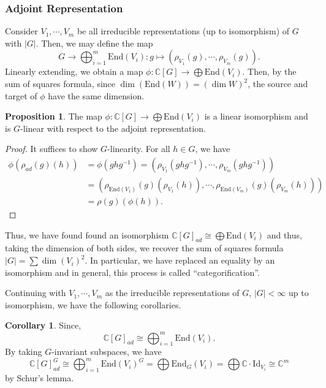\documentclass[]{article}
\theoremstyle{definition}
\newtheorem{corollary}{Corollary}[theorem]
\theoremstyle{definition}
\newtheorem{proposition}{Proposition}[section]
\begin{document}
\subsubsection{Adjoint Representation}

Consider \(V_1, \cdots, V_m\) be all irreducible representations 
(up to isomorphism) of \(G\) with \(|G|\). Then, we may define the map 
\[G \to \bigoplus_{i = 1}^m\text{End}(V_i) : g \mapsto 
  (\rho_{V_1}(g), \cdots, \rho_{V_m}(g)).\]
Linearly extending, we obtain a map \(\phi : \mathbb{C}[G] \to \bigoplus 
\text{End}(V_i)\). Then, by the sum of squares formula, since 
\(\dim(\text{End}(W)) = (\dim W)^2\), the source and target of \(\phi\) have 
the same dimension.

\begin{proposition}
  The map \(\phi : \mathbb{C}[G] \to \bigoplus \text{End}(V_i)\) is a 
  linear isomorphism and is \(G\)-linear with respect to the adjoint 
  representation.
\end{proposition}
\begin{proof}
  It suffices to show \(G\)-linearity. For all \(h \in G\), we have 
  \[\begin{split}
    \phi(\rho_{ad}(g)(h)) & = \phi(ghg^{-1}) = 
    (\rho_{V_1}(ghg^{-1}), \cdots, \rho_{V_m}(ghg^{-1}))\\
    & = (\rho_{\text{End}(V_1)}(g)(\rho_{V_1}(h)), \cdots, 
      \rho_{\text{End}(V_m)}(g)(\rho_{V_m}(h)))\\
    & = \rho(g)(\phi(h)).
  \end{split}\]
\end{proof}

Thus, we have found found an isomorphism 
\(\mathbb{C}[G]_{ad} \cong \bigoplus \text{End}(V_i)\) and thus, taking the 
dimension of both sides, we recover the sum of squares formula 
\(|G| = \sum \dim(V_i)^2\). In particular, we have replaced an equality by an 
isomorphism and in general, this process is called ``categorification''.

Continuing with \(V_1, \cdots, V_m\) as the irreducible representations of 
\(G\), \(|G| < \infty\) up to isomorphism, we have the following corollaries.

\begin{corollary}
  Since,
  \[\mathbb{C}[G]_{ad} \cong \bigoplus_{i = 1}^m \text{End}(V_i).\]
  By taking \(G\)-invariant subspaces, we have 
  \[\mathbb{C}[G]_{ad}^G \cong \bigoplus_{i = 1}^m \text{End}(V_i)^G = 
  \bigoplus \text{End}_G(V_i) = \bigoplus \mathbb{C} \cdot \text{Id}_{V_i} 
  \cong \mathbb{C}^m\]
  by Schur's lemma. 
\end{corollary}
\end{document}
